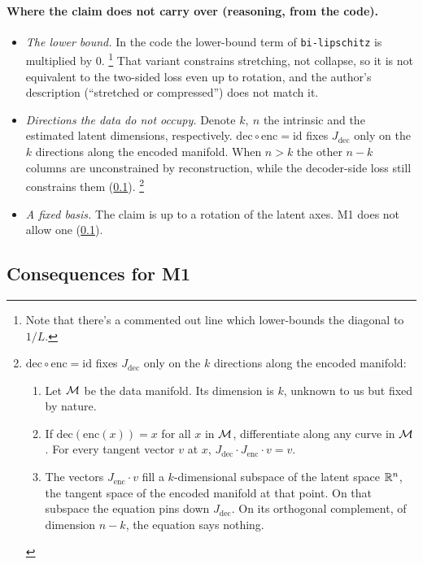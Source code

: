 \paragraph{Where the claim does not carry over (reasoning, from the code).}
\begin{itemize}[leftmargin=1.5em]
\item \emph{The lower bound.} In the code the lower-bound term of \texttt{bi-lipschitz} is 
      multiplied by $0$.
\footnote{Note that there's a commented out line which lower-bounds the diagonal to $1/L$.}
      That variant constrains stretching, not collapse, so it
      is not equivalent to the two-sided loss even up to rotation, and the author's
      description (``stretched or compressed'') does not match it.
\item \emph{Directions the data do not occupy.} Denote $k,\ n$ the intrinsic and the estimated
      latent dimensions, respectively. $\mathrm{dec}\circ\mathrm{enc}=
      \mathrm{id}$ fixes $J_{\mathrm{dec}}$ only on the $k$ directions along the
      encoded manifold. When $n>k$ the other $n-k$ columns are unconstrained by
      reconstruction, while the decoder-side loss still constrains them
      (\cref{app:bilip:m1}).
\footnote{
$\mathrm{dec} \circ \mathrm{enc} = \mathrm{id}$ fixes $J_{\mathrm{dec}}$ only on the $k$ directions 
along the encoded manifold:
\begin{enumerate}[nosep]
\item Let $\mathcal{M}$ be the data manifold. Its dimension is $k$, unknown to us but fixed by nature.
\item If $\mathrm{dec}(\mathrm{enc}(x)) = x$ for all $x$ in $\mathcal{M}$, differentiate along any curve in
$\mathcal{M}$. For every tangent vector $v$ at $x$, $J_{\mathrm{dec}} \cdot J_{\mathrm{enc}} \cdot v = v$.
\item The vectors $J_{\mathrm{enc}} \cdot v$ fill a $k$-dimensional subspace of the latent space $\mathbb{R}^n$, the 
tangent space of the encoded manifold at that point. On that subspace the equation pins down 
$J_{\mathrm{dec}}$. On its orthogonal complement, of dimension $n-k$, the equation says nothing.
\end{enumerate}
}
\item \emph{A fixed basis.} The claim is up to a rotation of the latent axes. M1 does
not
      allow one (\cref{app:bilip:m1}).
\end{itemize}

\subsection{Consequences for M1}
\label{app:bilip:m1}

